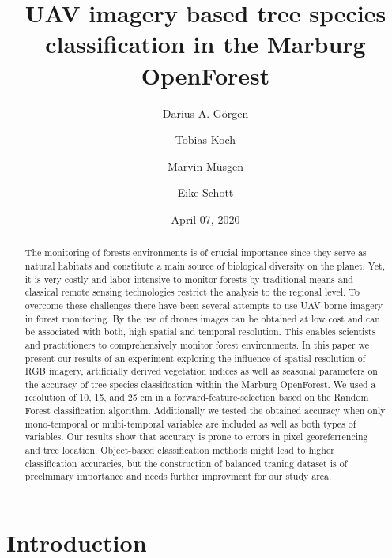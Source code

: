 \documentclass[]{article}
\title{UAV imagery based tree species classification in the Marburg OpenForest}
\author{Darius A. Görgen \and Tobias Koch \and Marvin Müsgen \and Eike Schott}
\date{April 07, 2020}
\begin{document}
\maketitle
\begin{abstract}
The monitoring of forests environments is of crucial importance since
they serve as natural habitats and constitute a main source of
biological diversity on the planet. Yet, it is very costly and labor
intensive to monitor forests by traditional means and classical remote
sensing technologies restrict the analysis to the regional level. To
overcome these challenges there have been several attempts to use
UAV-borne imagery in forest monitoring. By the use of drones images can
be obtained at low cost and can be associated with both, high spatial
and temporal resolution. This enables scientists and practitioners to
comprehensively monitor forest environments. In this paper we present
our results of an experiment exploring the influence of spatial
resolution of RGB imagery, artificially derived vegetation indices as
well as seasonal parameters on the accuracy of tree species
classification within the Marburg OpenForest. We used a resolution of
10, 15, and 25 cm in a forward-feature-selection based on the Random
Forest classification algorithm. Additionally we tested the obtained
accuracy when only mono-temporal or multi-temporal variables are
included as well as both types of variables. Our results show that
accuracy is prone to errors in pixel georeferrencing and tree location.
Object-based classification methods might lead to higher classification
accuracies, but the construction of balanced traning dataset is of
preelminary importance and needs further improvment for our study area.
\end{abstract}

{
\setcounter{tocdepth}{2}
\tableofcontents
}
\hypertarget{introduction}{%
\section{Introduction}\label{introduction}}
\end{document}
